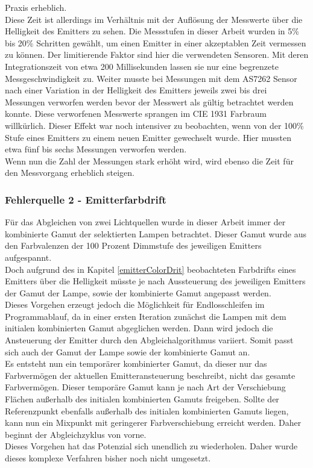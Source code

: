 \documentclass[11pt]{scrartcl}
\begin{document}
Praxis erheblich.\\
Diese Zeit ist allerdings im Verhältnis mit der Auflösung der Messwerte über die Helligkeit des Emitters zu sehen.
Die Messstufen in dieser Arbeit wurden in 5\% bis 20\% Schritten gewählt, um einen Emitter in einer akzeptablen Zeit
vermessen zu können. Der limitierende Faktor sind hier die verwendeten Sensoren. Mit deren Integrationszeit von etwa
200 Millisekunden lassen sie nur eine begrenzete Messgeschwindigkeit zu. Weiter musste bei Messungen mit dem AS7262
Sensor nach einer Variation in der Helligkeit des Emitters jeweils zwei bis drei Messungen verworfen werden bevor
der Messwert als gültig betrachtet werden konnte. Diese verworfenen Messwerte sprangen im CIE 1931 Farbraum willkürlich.
Dieser Effekt war noch intensiver zu beobachten, wenn von der 100\% Stufe eines Emitters zu einem neuen Emitter
gewechselt wurde. Hier mussten etwa fünf bis sechs Messungen verworfen werden.\\
Wenn nun die Zahl der Messungen stark erhöht wird, wird ebenso die Zeit für den Messvorgang erheblich steigen.
\subsubsection{Fehlerquelle 2 - Emitterfarbdrift}
Für das Abgleichen von zwei Lichtquellen wurde in dieser Arbeit immer der kombinierte Gamut der selektierten Lampen
betrachtet. Dieser Gamut wurde aus den Farbvalenzen der 100 Prozent Dimmstufe des jeweiligen Emitters aufgespannt.\\
Doch aufgrund des in Kapitel \ref{emitterColorDrit} beobachteten Farbdrifts eines Emitters über die Helligkeit müsste
je nach Aussteuerung des jeweiligen Emitters der Gamut der Lampe, sowie der kombinierte Gamut angepasst werden.\\
Dieses Vorgehen erzeugt jedoch die Möglichkeit für Endlosschleifen im Programmablauf, da in einer ersten Iteration
zunächst die Lampen mit dem initialen kombinierten Gamut abgeglichen werden. Dann wird jedoch die Ansteuerung der Emitter
durch den Abgleichalgorithmus variiert. Somit passt sich auch der Gamut der Lampe sowie der kombinierte Gamut an.\\
Es entsteht nun ein temporärer kombinierter Gamut, da dieser nur das Farbvermögen der aktuellen Emitteransteuerung
beschreibt, nicht das gesamte Farbvermögen. Dieser temporäre Gamut kann je nach Art der Verschiebung Flächen
außerhalb des initialen kombinierten Gamuts freigeben. Sollte der Referenzpunkt ebenfalls außerhalb des initialen
kombinierten Gamuts liegen, kann nun ein Mixpunkt mit geringerer Farbverschiebung erreicht werden. Daher beginnt
der Abgleichzyklus von vorne.\\
Dieses Vorgehen hat das Potenzial sich unendlich zu wiederholen. Daher wurde dieses komplexe Verfahren bisher noch
nicht umgesetzt.
\end{document}
